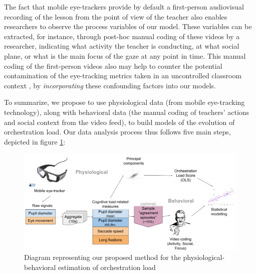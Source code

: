 \documentclass[10pt,journal,compsoc]{IEEEtran}
\begin{document}
The fact that mobile eye-trackers provide by default a first-person audiovisual recording of the lesson from the point of view of the teacher also enables researchers to observe the process variables of our model. These variables can be extracted, for instance, through post-hoc manual coding of these videos by a researcher, indicating what activity the teacher is conducting, at what social plane, or what is the main focus of the gaze at any point in time. This manual coding of the first-person videos also may help to counter the potential contamination of the eye-tracking metrics taken in an uncontrolled classroom context \cite{poole2006eye}, by \textit{incorporating} these confounding factors into our models.

To summarize, we propose to use physiological data (from mobile eye-tracking technology), along with behavioral data (the manual coding of teachers' actions and social context from the video feed), to build models of the evolution of orchestration load. Our data analysis process thus follows five main steps, depicted in figure \ref{fig:analysis}:

\begin{figure}[!t]
\centering
\includegraphics[width=\linewidth]{img/AnalysisMethodBase.png}
\caption{Diagram representing our proposed method for the physiological-behavioral estimation of orchestration load}
\label{fig:analysis}
\end{figure}
\end{document}
